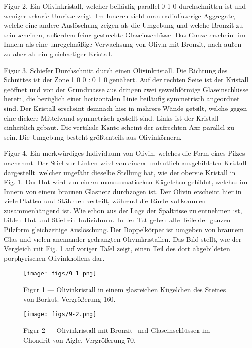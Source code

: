 \documentclass[a4paper, 11pt, oneside, polutonikogreek, german]{article}
\begin{document}
Figur 2. Ein Olivinkristall, welcher beiläufig parallel 0 1 0 durchschnitten ist und weniger scharfe Umrisse zeigt. Im Inneren sieht man radialfaserige Aggregate, welche eine andere Auslöschung zeigen als die Umgebung und welche Bronzit zu sein scheinen, außerdem feine gestreckte Glaseinschlüsse. Das Ganze erscheint im Innern als eine unregelmäßige Verwachsung von Olivin mit Bronzit, nach außen zu aber als ein gleichartiger Kristall.

Figur 3. Schiefer Durchschnitt durch einen Olivinkristall. Die Richtung des Schnittes ist der Zone 1 0 0 : 0 1 0 genähert. Auf der rechten Seite ist der Kristall geöffnet und von der Grundmasse aus dringen zwei geweihförmige Glaseinschlüsse herein, die bezüglich einer horizontalen Linie beiläufig symmetrisch angeordnet sind. Der Kristall erscheint demnach hier in mehrere Wände geteilt, welche gegen eine dickere Mittelwand symmetrisch gestellt sind. Links ist der Kristall einheitlich gebaut. Die vertikale Kante scheint der aufrechten Axe parallel zu sein. Die Umgebung besteht größtenteils aus Olivinkörnern.

Figur 4. Ein merkwürdiges Individuum von Olivin, welches die Form eines Pilzes nachahmt. Der Stiel zur Linken wird von einem undeutlich ausgebildeten Kristall dargestellt, welcher ungefähr dieselbe Stellung hat, wie der oberste Kristall in Fig. 1. Der Hut wird von einem monosomatischen Kügelchen gebildet, welches im Innern von einem braunen Glasnetz durchzogen ist. Der Olivin erscheint hier in viele Platten und Stäbchen zerteilt, während die Rinde vollkommen zusammenhängend ist. Wie schon aus der Lage der Spaltrisse zu entnehmen ist, bilden Hut und Stiel ein Individuum. In der Tat geben alle Teile der ganzen Pilzform gleichzeitige Auslöschung. Der Doppelkörper ist umgeben von braunem Glas und vielen aneinander gedrängten Olivinkristallen. Das Bild stellt, wie der Vergleich mit Fig. 1 auf voriger Tafel zeigt, einen Teil des dort abgebildeten porphyrischen Olivinknollens dar.
\clearpage

\vspace*{\fill}
\begin{figure}[H]
\centering
\texttt{[image: figs/9-1.png]}
\caption{\small Figur 1 --- Olivinkristall in einem glasreichen Kügelchen des Steines von Borkut. Vergrößerung 160.}
\end{figure}
\vspace*{\fill}
\clearpage

\vspace*{\fill}
\begin{figure}[H]
\centering
\texttt{[image: figs/9-2.png]}
\caption{\small Figur 2 --- Olivinkristall mit Bronzit- und Glaseinschlüssen im Chondrit von Aigle. Vergrößerung 70.}
\end{figure}
\vspace*{\fill}
\clearpage
\end{document}
